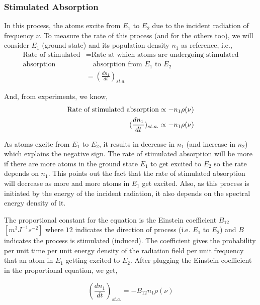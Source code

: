 \documentclass[12pt]{article}
\begin{document}
\subsubsection{Stimulated Absorption}

In this process, the atoms excite from $E_{1}$ to $E_{2}$ due to the incident radiation of frequency $\nu$. To measure the rate of this process (and for the others too), we will consider $E_{1}$ (ground state) and its population density $n_{1}$ as reference, i.e.,
\begin{align*}
    \text{Rate of stimulated} & = \text{Rate at which atoms are undergoing stimulated} \\
    \text{absorption} & \quad \text{absorption from } E_{1} \text{ to } E_{2} \\ 
    & = (\frac{dn_{1}}{dt})_{st.a.}
\end{align*}

And, from experiments, we know, 
\begin{align*}
    \textnormal{Rate of stimulated absorption} \propto -n_{1}\rho(\nu) \\ 
    (\frac{dn_{1}}{dt})_{st.a.} \propto -n_{1}\rho(\nu)
\end{align*}

As atoms excite from $E_{1}$ to $E_{2}$, it results in decrease in $n_{1}$ (and increase in $n_{2}$) which explains the negative sign. The rate of stimulated absorption will be more if there are more atoms in the ground state $E_{1}$ to get excited to $E_{2}$ so the rate depends on $n_{1}$. This points out the fact that the rate of stimulated absorption will decrease as more and more atoms in $E_{1}$ get excited. Also, as this process is initiated by the energy of the incident radiation, it also depends on the spectral energy density of it. \vspace{.2cm}

The proportional constant for the equation is the Einstein coefficient $B_{12}$ $[m^{3}J^{-1}s^{-2}]$ where $12$ indicates the direction of process (i.e. $E_{1}$ to $E_{2}$) and $B$ indicates the process is stimulated (induced). The coefficient gives the probability per unit time per unit energy density of the radiation field per unit frequency that an atom in $E_{1}$ getting excited to $E_{2}$. After plugging the Einstein coefficient in the proportional equation, we get,

\begin{equation}
    (\frac{dn_{1}}{dt})_{st.a.} = -B_{12}n_{1}\rho(\nu) 
\end{equation}
\end{document}
